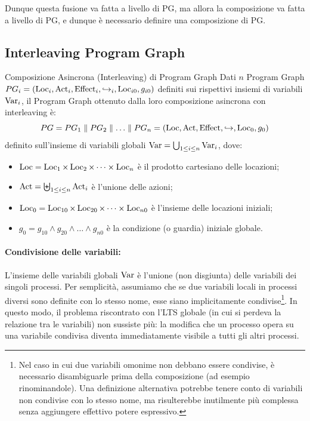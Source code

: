 Dunque questa fusione va fatta a livello di PG, ma allora la composizione va fatta a livello di PG, e dunque è necessario definire una composizione di PG\@.

\subsection{Interleaving Program Graph}

\begin{definition}{Composizione Asincrona (Interleaving) di Program Graph}
  Dati \(n\) Program Graph \(PG_i = (\operatorname{Loc}_i, \operatorname{Act}_i, \operatorname{Effect}_i, \hookrightarrow_i, \operatorname{Loc}_{i0}, g_{i0})\) definiti sui rispettivi insiemi di variabili \(\operatorname{Var}_i\), il Program Graph ottenuto dalla loro composizione asincrona con interleaving è:
  \[ PG = PG_1 \parallel PG_2 \parallel \ldots \parallel PG_n = (\operatorname{Loc}, \operatorname{Act}, \operatorname{Effect}, \hookrightarrow, \operatorname{Loc}_0, g_0) \]
  definito sull'insieme di variabili globali \(\operatorname{Var} = \bigcup_{1 \leq i \leq n} \operatorname{Var}_i\), dove:
  \begin{itemize}
    \item \(\operatorname{Loc} = \operatorname{Loc}_1 \times \operatorname{Loc}_2 \times \cdots \times \operatorname{Loc}_n\) è il prodotto cartesiano delle locazioni;
    \item \(\operatorname{Act} = \biguplus_{1 \leq i \leq n} \operatorname{Act}_i\) è l'unione delle azioni;
    \item \(\operatorname{Loc}_0 = \operatorname{Loc}_{10} \times \operatorname{Loc}_{20} \times \cdots \times \operatorname{Loc}_{n0}\) è l'insieme delle locazioni iniziali;
    \item \(g_0 = g_{10} \land g_{20} \land \ldots \land g_{n0}\) è la condizione (o guardia) iniziale globale.
  \end{itemize}
\end{definition}

\paragraph{Condivisione delle variabili:}
L'insieme delle variabili globali \(\operatorname{Var}\) è l'unione (non disgiunta) delle variabili dei singoli processi. Per semplicità, assumiamo che se due variabili locali in processi diversi sono definite con lo stesso nome, esse siano implicitamente condivise\footnote{Nel caso in cui due variabili omonime non debbano essere condivise, è necessario disambiguarle prima della composizione (ad esempio rinominandole). Una definizione alternativa potrebbe tenere conto di variabili non condivise con lo stesso nome, ma risulterebbe inutilmente più complessa senza aggiungere effettivo potere espressivo.}.
In questo modo, il problema riscontrato con l'LTS globale (in cui si perdeva la relazione tra le variabili) non sussiste più: la modifica che un processo opera su una variabile condivisa diventa immediatamente visibile a tutti gli altri processi.


